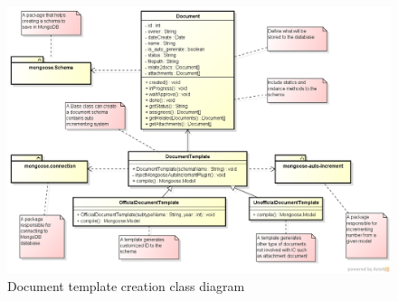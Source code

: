 \begin{figure}
	\caption{Document template creation class diagram}
	\label{fig:doc-template}
	\includegraphics[scale=0.5]{res/software-design/document_templating}
\end{figure}

